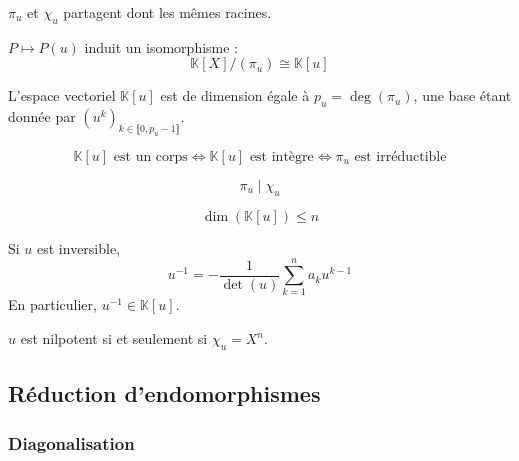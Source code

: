 
  \begin{remark}
    $\pi_u$ et $\chi_u$ partagent dont les mêmes racines.
  \end{remark}


  \begin{theorem}
    $P \mapsto P(u)$ induit un isomorphisme :
    \[ \mathbb{K}[X]/(\pi_u) \cong \mathbb{K}[u] \]
  \end{theorem}

  \begin{corollary}
    L'espace vectoriel $\mathbb{K}[u]$ est de dimension égale à $p_u = \deg(\pi_u)$, une base étant donnée par $(u^k)_{k \in \llbracket 0, p_u-1 \rrbracket}$.
  \end{corollary}

  \begin{corollary}
    \[ \mathbb{K}[u] \text{ est un corps} \iff \mathbb{K}[u] \text{ est intègre} \iff \pi_u \text{ est irréductible} \]
  \end{corollary}

  \begin{theorem}
    \[ \pi_u \mid \chi_u \]
  \end{theorem}

  \begin{corollary}
    \[ \dim(\mathbb{K}[u]) \leq n \]
  \end{corollary}

  \begin{corollary}
    Si $u$ est inversible,
    \[ u^{-1} = -\frac{1}{\det(u)} \sum_{k=1}^n a_k u^{k-1} \]
    En particulier, $u^{-1} \in \mathbb{K}[u]$.
  \end{corollary}

  \begin{corollary}
    $u$ est nilpotent si et seulement si $\chi_u = X^n$.
  \end{corollary}

  \subsection{Réduction d'endomorphismes}

  \subsubsection{Diagonalisation}


